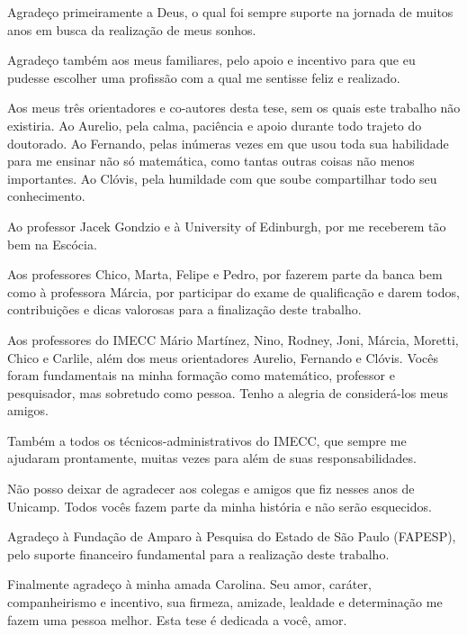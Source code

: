 

Agradeço primeiramente a Deus, o qual foi sempre suporte na jornada de muitos anos em busca da realização de meus sonhos.

Agradeço também aos meus familiares, pelo apoio  e  incentivo para que eu pudesse escolher uma profissão com a qual me sentisse feliz e realizado.

Aos meus três orientadores e co-autores desta tese, sem os quais este trabalho não existiria. Ao Aurelio, pela calma, paciência e apoio durante todo trajeto do doutorado. Ao Fernando, pelas inúmeras vezes em que usou toda sua habilidade para me ensinar não só matemática, como  tantas outras  coisas não menos importantes. Ao Clóvis, pela humildade com que soube compartilhar todo seu conhecimento. 

Ao professor Jacek Gondzio e à University of Edinburgh, por me receberem tão bem na Escócia.


Aos professores Chico, Marta, Felipe e Pedro, por fazerem parte da banca bem como à professora Márcia, por participar do exame de qualificação e darem todos, contribuições e dicas valorosas para a finalização deste trabalho.

Aos professores do IMECC Mário Martínez, Nino, Rodney, Joni, Márcia, Moretti, Chico e Carlile,  além dos meus orientadores Aurelio, Fernando e Clóvis. Vocês foram fundamentais na minha formação como  matemático, professor e  pesquisador,  mas sobretudo como pessoa. Tenho a alegria de considerá-los meus amigos.  

Também a todos os técnicos-administrativos do IMECC, que  sempre me ajudaram prontamente, muitas vezes para além de suas responsabilidades.

Não posso deixar de agradecer aos  colegas e amigos que fiz nesses  anos de Unicamp. Todos vocês fazem parte da minha história e não serão esquecidos.

Agradeço  à Fundação de Amparo à Pesquisa do Estado de São Paulo (FAPESP), pelo suporte financeiro fundamental para a realização deste trabalho.

Finalmente agradeço à minha amada Carolina. Seu amor, caráter, companheirismo e incentivo, sua firmeza, amizade, lealdade e determinação me fazem uma pessoa melhor. Esta tese é dedicada a você, amor.

